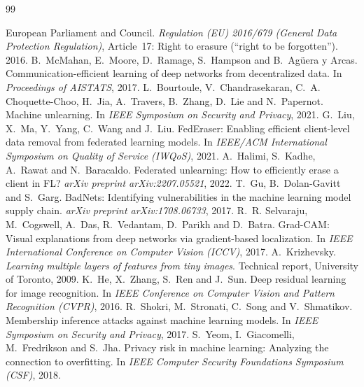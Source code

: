 \documentclass[11pt,a4paper]{article}
\begin{document}
\begingroup
\raggedright
\small
\begin{thebibliography}{99}
  European Parliament and Council.
  \emph{Regulation (EU) 2016/679 (General Data Protection Regulation)},
  Article~17: Right to erasure (``right to be forgotten''). 2016.
  B.~McMahan, E.~Moore, D.~Ramage, S.~Hampson and B.~Ag\"uera y Arcas.
  Communication-efficient learning of deep networks from decentralized data.
  In \emph{Proceedings of AISTATS}, 2017.
  L.~Bourtoule, V.~Chandrasekaran, C.~A. Choquette-Choo, H.~Jia, A.~Travers,
  B.~Zhang, D.~Lie and N.~Papernot.
  Machine unlearning.
  In \emph{IEEE Symposium on Security and Privacy}, 2021.
  G.~Liu, X.~Ma, Y.~Yang, C.~Wang and J.~Liu.
  FedEraser: Enabling efficient client-level data removal from federated
  learning models.
  In \emph{IEEE/ACM International Symposium on Quality of Service (IWQoS)}, 2021.
  A.~Halimi, S.~Kadhe, A.~Rawat and N.~Baracaldo.
  Federated unlearning: How to efficiently erase a client in FL?
  \emph{arXiv preprint arXiv:2207.05521}, 2022.
  T.~Gu, B.~Dolan-Gavitt and S.~Garg.
  BadNets: Identifying vulnerabilities in the machine learning model supply
  chain.
  \emph{arXiv preprint arXiv:1708.06733}, 2017.
  R.~R. Selvaraju, M.~Cogswell, A.~Das, R.~Vedantam, D.~Parikh and D.~Batra.
  Grad-CAM: Visual explanations from deep networks via gradient-based
  localization.
  In \emph{IEEE International Conference on Computer Vision (ICCV)}, 2017.
  A.~Krizhevsky.
  \emph{Learning multiple layers of features from tiny images}.
  Technical report, University of Toronto, 2009.
  K.~He, X.~Zhang, S.~Ren and J.~Sun.
  Deep residual learning for image recognition.
  In \emph{IEEE Conference on Computer Vision and Pattern Recognition (CVPR)}, 2016.
  R.~Shokri, M.~Stronati, C.~Song and V.~Shmatikov.
  Membership inference attacks against machine learning models.
  In \emph{IEEE Symposium on Security and Privacy}, 2017.
  S.~Yeom, I.~Giacomelli, M.~Fredrikson and S.~Jha.
  Privacy risk in machine learning: Analyzing the connection to overfitting.
  In \emph{IEEE Computer Security Foundations Symposium (CSF)}, 2018.
\end{thebibliography}
\endgroup

\clearpage
{}
\end{document}
